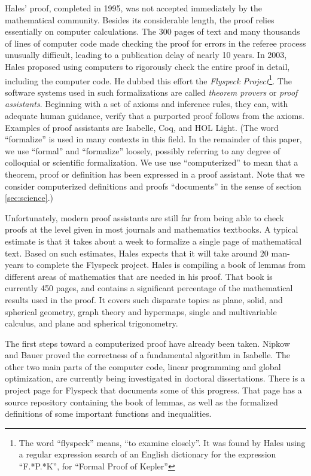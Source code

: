 Hales' proof, completed in 1995, was not accepted immediately by the
mathematical community.  Besides its considerable length, the proof relies
essentially on computer calculations.  The 300 pages of text and many thousands
of lines of computer code made checking the proof for errors in the referee
process unusually difficult, leading to a publication delay of nearly 10 years.
In 2003, Hales proposed using computers to rigorously check the entire proof in
detail, including the computer code.  He dubbed this effort the \textit{Flyspeck
  Project}\footnote{The word ``flyspeck'' means, ``to examine closely''.  It was
  found by Hales using a regular expression search of an English dictionary for
  the expression ``F.*P.*K'', for ``Formal Proof of Kepler''}.  The software
systems used in such formalizations are called \textit{theorem provers} or
\textit{proof assistants}.  Beginning with a set of axioms and inference rules,
they can, with adequate human guidance, verify that a purported proof follows
from the axioms.  Examples of proof assistants are
Isabelle\cite{Paulson:1994:Isabelle}, Coq\cite{Bertot:2004:CoqBook}, and HOL
Light\cite{Harrison:2000:HOL-Light}. (The word ``formalize'' is used in many
contexts in this field.  In the remainder of this paper, we use ``formal'' and
``formalize'' loosely, possibly referring to any degree of colloquial or
scientific formalization.  We use use ``computerized'' to mean that a theorem,
proof or definition has been expressed in a proof assistant.  Note that we
consider computerized definitions and proofs ``documents'' in the sense of
section \ref{sec:science}.)

  Unfortunately, modern proof assistants are still far from being able to check
proofs at the level given in most journals and mathematics textbooks.  A typical
estimate is that it takes about a week to formalize a single page of mathematical
text.  Based on such estimates, Hales expects that it will take 
around 20 man-years to complete the Flyspeck project.  
Hales is compiling a book\cite{Hales:2007:FlyspeckBook}
of lemmas from different areas of mathematics that are needed in his proof. 
That book is currently 450 pages, and contains a significant percentage
of the mathematical results used in the proof.  It covers such disparate topics
as plane, solid, and spherical geometry, graph theory and hypermaps, single and
multivariable calculus, and plane and spherical trigonometry.

The first steps toward a computerized proof have already been taken.
Nipkow and Bauer\cite{Nipkow:2005:Tame} proved the correctness of a
fundamental algorithm in Isabelle.  The other two main parts of the
computer code, linear programming and global optimization, are
currently being investigated in doctoral
dissertations\cite{Zumkeller:2006:TaylorModels,Obua:2005:LinearPrograms}.
There is a project page\cite{website:FlyspeckProjectPage} for Flyspeck
that documents some of this progress.  That page has a source
repository containing the book of lemmas, as well as the formalized
definitions of some important functions and inequalities.  

